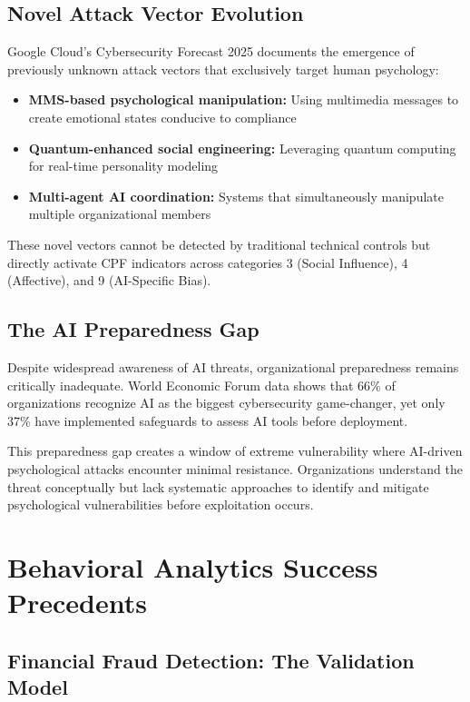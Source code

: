 \documentclass[11pt,a4paper]{article}
\begin{document}
\subsection{Novel Attack Vector Evolution}

Google Cloud's Cybersecurity Forecast 2025 documents the emergence of previously unknown attack vectors that exclusively target human psychology\cite{googlecloud2024}:

\begin{itemize}
\item \textbf{MMS-based psychological manipulation:} Using multimedia messages to create emotional states conducive to compliance
\item \textbf{Quantum-enhanced social engineering:} Leveraging quantum computing for real-time personality modeling
\item \textbf{Multi-agent AI coordination:} Systems that simultaneously manipulate multiple organizational members
\end{itemize}

These novel vectors cannot be detected by traditional technical controls but directly activate CPF indicators across categories 3 (Social Influence), 4 (Affective), and 9 (AI-Specific Bias).

\subsection{The AI Preparedness Gap}

Despite widespread awareness of AI threats, organizational preparedness remains critically inadequate. World Economic Forum data shows that 66\% of organizations recognize AI as the biggest cybersecurity game-changer, yet only 37\% have implemented safeguards to assess AI tools before deployment\cite{wef2025}.

This preparedness gap creates a window of extreme vulnerability where AI-driven psychological attacks encounter minimal resistance. Organizations understand the threat conceptually but lack systematic approaches to identify and mitigate psychological vulnerabilities before exploitation occurs.

\section{Behavioral Analytics Success Precedents}

\subsection{Financial Fraud Detection: The Validation Model}
\end{document}
